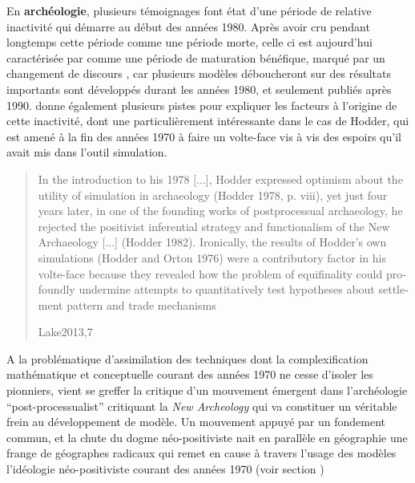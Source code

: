
En \textbf{archéologie}, plusieurs témoignages \autocite[6-7]{Lake2013} font état d'une période de relative inactivité  qui démarre au début des années 1980. Après avoir cru pendant longtemps cette période comme une période morte, celle ci est aujourd'hui caractérisée par \textcite{Lake2013} comme une période de maturation bénéfique, marqué par un changement de discours , car plusieurs modèles déboucheront sur des résultats importants sont développés durant les années 1980, et seulement publiés après 1990.  donne également plusieurs pistes pour expliquer les facteurs à l'origine de cette inactivité, dont une particulièrement intéressante dans le cas de Hodder, qui est amené à la fin des années 1970 à faire un volte-face vis à vis des espoirs qu'il avait mis dans l'outil simulation. 

\foreignblockquote{english}[Lake2013,7]{In the introduction to his 1978 [...], Hodder expressed optimism about the utility of simulation in archaeology (Hodder 1978, p. viii), yet just four years later, in one of the founding works of postprocessual archaeology, he rejected the positivist inferential strategy and functionalism of the New Archaeology [...] (Hodder 1982). Ironically, the results of Hodder's own simulations (Hodder and Orton 1976) were a contributory factor in his volte-face because they revealed how the problem of equifinality could profoundly undermine attempts to quantitatively test hypotheses about settlement pattern and trade mechanisms}

A la problématique d'assimilation des techniques dont la complexification mathématique et conceptuelle courant des années 1970 ne cesse d'isoler les pionniers, vient se greffer la critique d'un mouvement émergent dans l'archéologie \foreignquote{english}{post-processualist} critiquant la \textit{New Archeology} qui va constituer un véritable frein au développement de modèle. Un mouvement appuyé par un fondement commun, et la chute du dogme néo-positiviste nait en parallèle en géographie une frange de géographes radicaux qui remet en cause à travers l'usage des modèles l'idéologie néo-positiviste courant des années 1970 (voir section )

